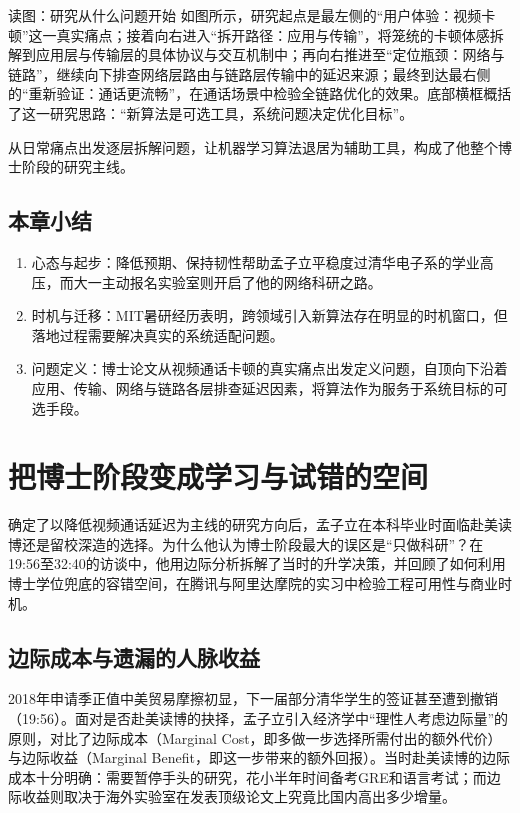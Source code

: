 \documentclass[UTF8,a4paper,11pt,fontset=fandol]{ctexart}
\begin{document}
\begin{knowledgebox}{读图：研究从什么问题开始}
如图所示，研究起点是最左侧的“用户体验：视频卡顿”这一真实痛点；接着向右进入“拆开路径：应用与传输”，将笼统的卡顿体感拆解到应用层与传输层的具体协议与交互机制中；再向右推进至“定位瓶颈：网络与链路”，继续向下排查网络层路由与链路层传输中的延迟来源；最终到达最右侧的“重新验证：通话更流畅”，在通话场景中检验全链路优化的效果。底部横框概括了这一研究思路：“新算法是可选工具，系统问题决定优化目标”。
\end{knowledgebox}
从日常痛点出发逐层拆解问题，让机器学习算法退居为辅助工具，构成了他整个博士阶段的研究主线。
\subsection{本章小结}
\begin{enumerate}
\item 心态与起步：降低预期、保持韧性帮助孟子立平稳度过清华电子系的学业高压，而大一主动报名实验室则开启了他的网络科研之路。
\item 时机与迁移：MIT暑研经历表明，跨领域引入新算法存在明显的时机窗口，但落地过程需要解决真实的系统适配问题。
\item 问题定义：博士论文从视频通话卡顿的真实痛点出发定义问题，自顶向下沿着应用、传输、网络与链路各层排查延迟因素，将算法作为服务于系统目标的可选手段。
\end{enumerate}
\section{把博士阶段变成学习与试错的空间}
确定了以降低视频通话延迟为主线的研究方向后，孟子立在本科毕业时面临赴美读博还是留校深造的选择。为什么他认为博士阶段最大的误区是“只做科研”？在19:56至32:40的访谈中，他用边际分析拆解了当时的升学决策，并回顾了如何利用博士学位兜底的容错空间，在腾讯与阿里达摩院的实习中检验工程可用性与商业时机。
\subsection{边际成本与遗漏的人脉收益}
2018年申请季正值中美贸易摩擦初显，下一届部分清华学生的签证甚至遭到撤销（19:56）。面对是否赴美读博的抉择，孟子立引入经济学中“理性人考虑边际量”的原则，对比了边际成本（Marginal Cost，即多做一步选择所需付出的额外代价）与边际收益（Marginal Benefit，即这一步带来的额外回报）。当时赴美读博的边际成本十分明确：需要暂停手头的研究，花小半年时间备考GRE和语言考试；而边际收益则取决于海外实验室在发表顶级论文上究竟比国内高出多少增量。
\end{document}
